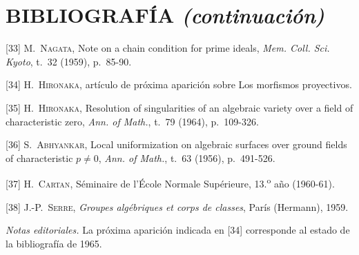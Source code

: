 \clearpage
{}
{}
\section*{BIBLIOGRAFÍA \textnormal{\emph{(continuación)}}}

\begingroup
\small
\setlength{\parindent}{0pt}
\setlength{\parskip}{4pt}

[33] M.~\textsc{Nagata}, Note on a chain condition for prime
ideals, \emph{Mem. Coll. Sci. Kyoto}, t.~32 (1959), p.~85-90.

[34] H.~\textsc{Hironaka}, artículo de próxima aparición sobre
Los morfismos proyectivos.

[35] H.~\textsc{Hironaka}, Resolution of singularities of an
algebraic variety over a field of characteristic zero, \emph{Ann. of Math.},
t.~79 (1964), p.~109-326.

[36] S.~\textsc{Abhyankar}, Local uniformization on algebraic
surfaces over ground fields of characteristic $p\ne0$, \emph{Ann. of
Math.}, t.~63 (1956), p.~491-526.

[37] H.~\textsc{Cartan}, Séminaire de l'École Normale
Supérieure, 13.\textsuperscript{o} año (1960-61).

[38] J.-P.~\textsc{Serre}, \emph{Groupes algébriques et corps de
classes}, París (Hermann), 1959.

\endgroup

\par\smallskip
\noindent\textit{Notas editoriales.} La próxima aparición indicada en [34]
corresponde al estado de la bibliografía de 1965.
